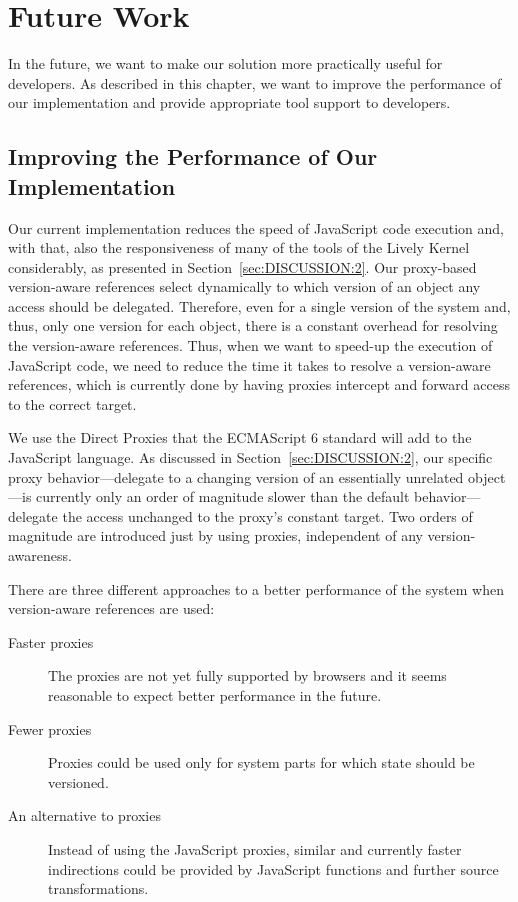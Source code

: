 \chapter{Future Work} \label{chapter:FUTURE_WORK}

In the future, we want to make our solution more practically useful for developers.
As described in this chapter, we want to improve the performance of our implementation and provide appropriate tool support to developers.



\section{Improving the Performance of Our Implementation} \label{sec:FUTURE_WORK:1}

Our current implementation reduces the speed of JavaScript code execution and, with that, also the responsiveness of many of the tools of the Lively Kernel considerably, as presented in Section~\ref{sec:DISCUSSION:2}.
Our proxy-based version-aware references select dynamically to which version of an object any access should be delegated.
Therefore, even for a single version of the system and, thus, only one version for each object, there is a constant overhead for resolving the version-aware references.
Thus, when we want to speed-up the execution of JavaScript code, we need to reduce the time it takes to resolve a version-aware references, which is currently done by having proxies intercept and forward access to the correct target.

We use the Direct Proxies that the ECMAScript 6 standard will add to the JavaScript language.
As discussed in Section~\ref{sec:DISCUSSION:2}, our specific proxy behavior---delegate to a changing version of an essentially unrelated object---is currently only an order of magnitude slower than the default behavior---delegate the access unchanged to the proxy's constant target.
Two orders of magnitude are introduced just by using proxies, independent of any version-awareness.

There are three different approaches to a better performance of the system when version-aware references are used:

\begin{description}
    \item[Faster proxies] The proxies are not yet fully supported by browsers and it seems reasonable to expect better performance in the future.
    \item[Fewer proxies] Proxies could be used only for system parts for which state should be versioned.
    \item[An alternative to proxies] Instead of using the JavaScript proxies, similar and currently faster indirections could be provided by JavaScript functions and further source transformations.
\end{description}

